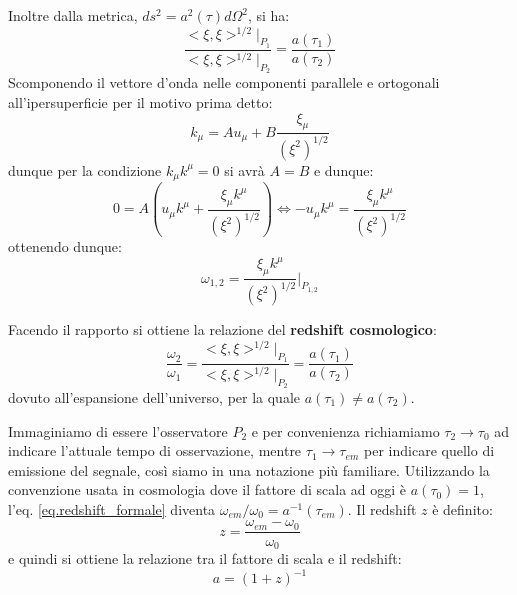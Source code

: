 Inoltre dalla metrica, $ds^2 =  a^2(\tau)d\Omega^2$, si ha:
\begin{equation*}
    \frac{<\xi , \xi>^{1/2}|_{P_1}}{<\xi , \xi>^{1/2}|_{P_2}} = \frac{a(\tau_1)}{a(\tau_2)}
\end{equation*}
Scomponendo il vettore d'onda nelle componenti parallele e ortogonali all'ipersuperficie per il motivo prima detto:
\begin{equation*}
    k_\mu = A u_\mu + B \frac{\xi_\mu}{(\xi^2)^{1/2}}
\end{equation*}
dunque per la condizione $k_\mu k^\mu=0$ si avrà $A=B$ e dunque:
\begin{equation*}
    0 = A\left(  u_\mu k^\mu + \frac{\xi_\mu k^\mu}{(\xi^2)^{1/2}}\right) \iff - u_\mu k^\mu =  \frac{\xi_\mu k^\mu}{(\xi^2)^{1/2}}
\end{equation*}
ottenendo dunque:
\begin{equation*}
    \omega_{1,2} = \frac{\xi_\mu k^\mu}{(\xi^2)^{1/2}} \Big|_{P_{1,2}}
\end{equation*}

Facendo il rapporto si ottiene la relazione del \textbf{redshift cosmologico}:
\begin{equation}
    \frac{\omega_2}{\omega_1} =    \frac{<\xi , \xi>^{1/2}|_{P_1}}{<\xi , \xi>^{1/2}|_{P_2}} = \frac{a(\tau_1)}{a(\tau_2)}
    \label{eq.redshift_formale}
\end{equation}
dovuto all'espansione dell'universo, per la quale $a(\tau_1) \neq a(\tau_2)$.

Immaginiamo di essere l'osservatore $P_2$ e per convenienza richiamiamo $\tau_2 \rightarrow \tau_0$ ad indicare l'attuale tempo di osservazione, mentre $\tau_1 \rightarrow \tau_{em}$ per indicare quello di emissione del segnale, così siamo in una notazione più familiare. Utilizzando la convenzione usata in cosmologia dove il fattore di scala ad oggi è $a(\tau_0) = 1$, l'eq. \ref{eq.redshift_formale} diventa $\omega_{em}/\omega_{0} = a^{-1}(\tau_{em})$. Il redshift $z$ è definito:
\begin{equation}
    z = \frac{\omega_{em} - \omega_0}{\omega_0}
    \label{eq.redshift_z}
\end{equation}
e quindi si ottiene la relazione tra il fattore di scala e il redshift:
\begin{equation}
    a = (1+z)^{-1}
    \label{eq.redshift_relazione_a_z}
\end{equation}

